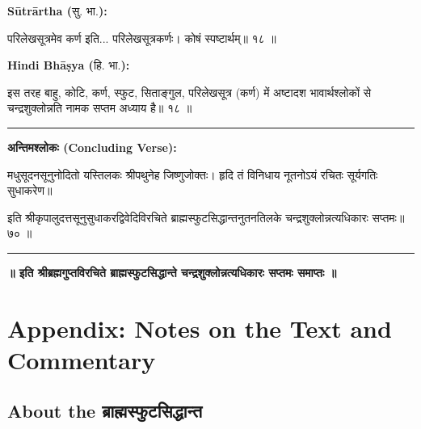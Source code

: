 \documentclass[11pt,a4paper]{article}
\newcommand{\dev}[1]{{\devanagarifont #1}}
\newcommand{\arth}{\textbf{Sūtrārtha (}\dev{सु. भा.}\textbf{):}\ }
\newcommand{\hindi}{\textbf{Hindi Bhāṣya (}\dev{हि. भा.}\textbf{):}\ }
\newenvironment{sanskritverse}{%
  \begin{center}\begin{minipage}{0.9\textwidth}
  \setlength{\leftskip}{1em}
  \setlength{\rightskip}{1em}
  \dev
}{\end{minipage}\end{center}}
\begin{document}
\noindent\arth
\begin{sanskritverse}
परिलेखसूत्रमेव कर्ण इति... परिलेखसूत्रकर्णः। कोषं स्पष्टार्थम्॥ १८ ॥
\end{sanskritverse}

\noindent\hindi
\begin{sanskritverse}
इस तरह बाहु, कोटि, कर्ण, स्फुट, सिताङ्गुल, परिलेखसूत्र (कर्ण) में अष्टादश
भावार्थश्लोकों से चन्द्रशुक्लोन्नति नामक सप्तम अध्याय है॥ १८ ॥
\end{sanskritverse}

\vspace{1em}
\begin{center}
\textcolor{rulecolor}{\rule{0.8\textwidth}{0.5pt}}
\end{center}

\noindent\textbf{\dev{अन्तिमश्लोकः (Concluding Verse):}}
\begin{sanskritverse}
मधुसूदनसूनुनोदितो यस्तिलकः श्रीपथुनेह जिष्णुजोक्तः।
हृदि तं विनिधाय नूतनोऽयं रचितः सूर्यगतिः सुधाकरेण॥
\end{sanskritverse}

\begin{sanskritverse}
इति श्रीकृपालुदत्तसूनुसुधाकरद्विवेदिविरचिते ब्राह्मस्फुटसिद्धान्तनुतनतिलके
चन्द्रशुक्लोन्नत्यधिकारः सप्तमः॥ ७० ॥
\end{sanskritverse}

\begin{center}
\textcolor{rulecolor}{\rule{0.8\textwidth}{0.5pt}}
\end{center}

\noindent\textbf{॥ इति श्रीब्रह्मगुप्तविरचिते ब्राह्मस्फुटसिद्धान्ते चन्द्रशुक्लोन्नत्यधिकारः सप्तमः समाप्तः ॥}

\vspace{2cm}

\newpage
\section*{Appendix: Notes on the Text and Commentary}

\subsection*{About the \dev{ब्राह्मस्फुटसिद्धान्त}}
\end{document}
